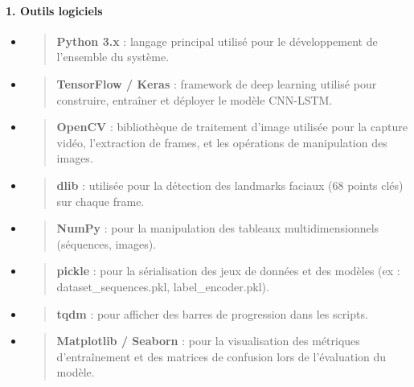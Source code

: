 \documentclass[
]{article}
\begin{document}
\hypertarget{outils-logiciels}{%
\paragraph{\texorpdfstring{\textbf{1. Outils logiciels}}{1. Outils logiciels}}\label{outils-logiciels}}

\begin{itemize}
\item
  \begin{quote}
  \textbf{Python 3.x} : langage principal utilisé pour le développement de l'ensemble du système.
  \end{quote}
\item
  \begin{quote}
  \textbf{TensorFlow / Keras} : framework de deep learning utilisé pour construire, entraîner et déployer le modèle CNN-LSTM.
  \end{quote}
\item
  \begin{quote}
  \textbf{OpenCV} : bibliothèque de traitement d'image utilisée pour la capture vidéo, l'extraction de frames, et les opérations de manipulation des images.
  \end{quote}
\item
  \begin{quote}
  \textbf{dlib} : utilisée pour la détection des landmarks faciaux (68 points clés) sur chaque frame.
  \end{quote}
\item
  \begin{quote}
  \textbf{NumPy} : pour la manipulation des tableaux multidimensionnels (séquences, images).
  \end{quote}
\item
  \begin{quote}
  \textbf{pickle} : pour la sérialisation des jeux de données et des modèles (ex : dataset\_sequences.pkl, label\_encoder.pkl).
  \end{quote}
\item
  \begin{quote}
  \textbf{tqdm} : pour afficher des barres de progression dans les scripts.
  \end{quote}
\item
  \begin{quote}
  \textbf{Matplotlib / Seaborn} : pour la visualisation des métriques d'entraînement et des matrices de confusion lors de l'évaluation du modèle.
  \end{quote}
\end{itemize}
\end{document}
